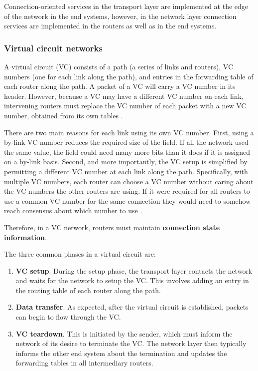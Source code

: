 Connection-oriented services in the transport layer are implemented at the edge of the network in the end systems, however, in the network layer connection services are implemented in the routers as well as in the end systems.

\subsubsection{Virtual circuit networks}

A virtual circuit (VC) consists of a path (a series of links and routers), VC numbers (one for each link along the path), and entries in the forwarding table of each router along the path.
A packet of a VC will carry a VC number in its header.
However, because a VC may have a different VC number on each link, intervening routers must replace the VC number of each packet with a new VC number, obtained from its own tables \cite[p.~314]{computer-networking-kurose-2012}.

There are two main reasons for each link using its own VC number.
First, using a by-link VC number reduces the required size of the field. If all the network used the same value, the field could need many more bits than it does if it is assigned on a by-link basis.
Second, and more importantly, the VC setup is simplified by permitting a different VC number at each link along the path.
Specifically, with multiple VC numbers, each router can choose a VC number without caring about the VC numbers the other routers are using. If it were required for all routers to use a common VC number for the same connection they would need to somehow reach consensus about which number to use \cite[p.~315]{computer-networking-kurose-2012}.

Therefore, in a VC network, routers must maintain \textbf{connection state information}.

The three common phases in a virtual circuit are:
\begin{enumerate}
\item \textbf{VC setup}. During the setup phase, the transport layer contacts the network and waits for the network to setup the VC. This involves adding an entry in the routing table of each router along the path.
\item \textbf{Data transfer}. As expected, after the virtual circuit is established, packets can begin to flow through the VC.
\item \textbf{VC teardown}. This is initiated by the sender, which must inform the network of its desire to terminate the VC. The network layer then typically informs the other end system about the termination and updates the forwarding tables in all intermediary routers.
\end{enumerate}

